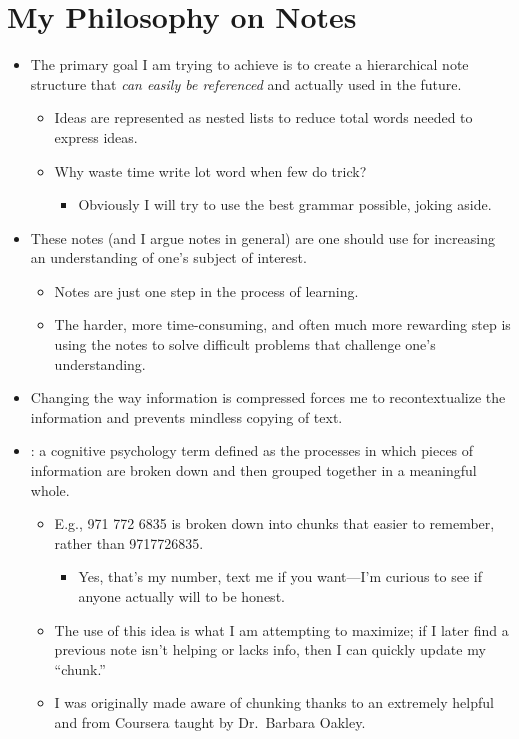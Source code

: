 \documentclass{inVerba-notes}
\begin{document}
\section{My Philosophy on Notes}\label{philosophy of notes}
\begin{itemize}
    \item The primary goal I am trying to achieve is to create a hierarchical note structure that \emph{can easily be referenced} and actually used in the future.
    \begin{itemize}
        \item Ideas are represented as nested lists to reduce total words needed to express ideas.
        \item Why waste time write lot word when few do trick?
            \begin{itemize}
                \item Obviously I will try to use the best grammar possible, joking aside.
            \end{itemize}
    \end{itemize}
    \item These notes (and I argue notes in general) are  one should use for increasing an understanding of one's subject of interest. 
        \begin{itemize}
            \item Notes are just one step in the process of learning.
            \item The harder, more time-consuming, and often much more rewarding step is using the notes to solve difficult problems that challenge one's understanding.
        \end{itemize}
    \item Changing the way information is compressed forces me to recontextualize the information and prevents mindless copying of text.
    \item {}: a cognitive psychology term defined as the processes in which pieces of information are broken down and then grouped together in a meaningful whole.
        \begin{itemize}
            \item E.g., 971 772 6835 is broken down into chunks that easier to remember, rather than 9717726835. 
                \begin{itemize}
                    \item Yes, that's my number, text me if you want---I'm curious to see if anyone actually will to be honest.
                \end{itemize}
            \item The use of this idea is what I am attempting to maximize; if I later find a previous note isn't helping or lacks info, then I can quickly update my ``chunk.''
            \item I was originally made aware of chunking thanks to an extremely helpful and  from Coursera taught by Dr.\ Barbara Oakley.
        \end{itemize}

\end{itemize}
\end{document}
